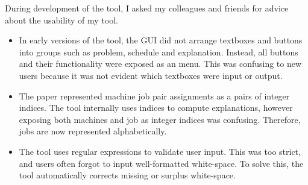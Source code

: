 During development of the tool, I asked my colleagues and friends for advice about the usability of my tool.

\begin{itemize}
	\item In early versions of the tool, the GUI did not arrange textboxes and buttons into groups such as problem, schedule and explanation. Instead, all buttons and their functionality were exposed as an menu. This was confusing to new users because it was not evident which textboxes were input or output.
	\item The paper \cite{aes} represented machine job pair assignments as a pairs of integer indices. The tool internally uses indices to compute explanations, however exposing both machines and job as integer indices was confusing. Therefore, jobs are now represented alphabetically.
	\item The tool uses regular expressions to validate user input. This was too strict, and users often forgot to input well-formatted white-space. To solve this, the tool automatically corrects missing or surplus white-space.
\end{itemize}